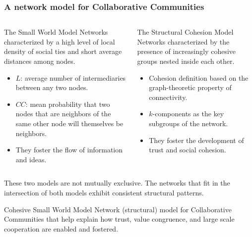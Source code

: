 \documentclass[ignorenonframetext,red,8pt,notes=hide]{beamer}
\begin{document}
\begin{frame}
\frametitle{A network model for Collaborative Communities}

\begin{columns}[c]
\begin{column}{0.5\textwidth}
\begin{block}{The Small World Model}
Networks characterized by a high level of local density of social ties and short average distances among nodes.

\begin{itemize}
\item $L$: average number of intermediaries between any two nodes.
\item $CC$: mean probability that two nodes that are neighbors of the same other node will themselves be neighbors.
\item They foster the flow of information and ideas.

\end{itemize}
\end{block}
\end{column}

\begin{column}{0.5\textwidth}
\begin{block}{The Structural Cohesion Model}
Networks characterized by the presence of increasingly cohesive groups nested inside each other. 
\begin{itemize}
\item Cohesion definition based on the graph-theoretic property of connectivity.
\item $k$-components as the key subgroups of the network.
\item They foster the development of trust and social cohesion.
\end{itemize}
\end{block}
\end{column}

\end{columns}

\pause

\vspace{0.2cm}

These two models are not mutually exclusive. The networks that fit in the intersection of both models exhibit consistent structural patterns.

\begin{block}{Cohesive Small World Model}
Network (structural) model for Collaborative Communities that help explain how trust, value congruence, and large scale cooperation are enabled and fostered.


\end{block}
\end{frame}
\end{document}
